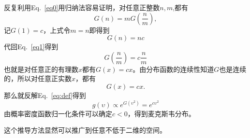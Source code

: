 \documentclass[12pt,CJK]{article}
\begin{document}
  反复利用Eq.~\eqref{eq0}用归纳法容易证明，对任意正整数$n,m$,都有
  \begin{equation}
  G(n) = m G\left(\frac{n}{m}\right), \label{eq1}
  \end{equation}
  记$G(1)=c$，上式令$m=n$即得到
  \begin{equation}
  G(n) = n c
  \end{equation}
  代回Eq.~\eqref{eq1}得到
  \begin{equation}
  G\left(\frac{n}{m}\right) = c \frac{n}{m}
  \end{equation}
  也就是对任意正的有理数$x$都有$G(x) = cx$。由分布函数的连续性知道$G$也是连续的，所以对任意正实数$x$，都有
  \begin{equation}
  G(x) = cx.  
  \end{equation}
  那么就反解Eq.~\eqref{eq:def}得到
  \begin{equation}
  g(\upsilon) \propto e^{G(\upsilon^2)} = e^{c\upsilon^2} 
  \end{equation}
  由概率密度函数归一化条件可以确定$c<0$，得到麦克斯韦分布。

  
  这个推导方法显然可以推广到任意不低于二维的空间。

\ech
\end{document}
